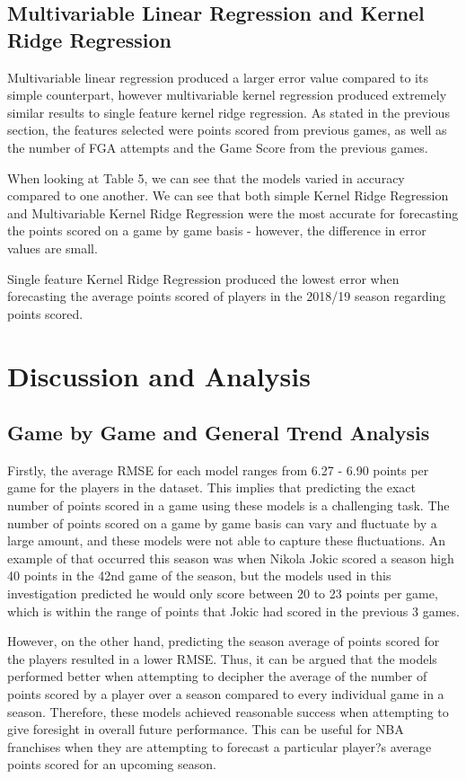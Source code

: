 \documentclass[a4paper,11pt,twoside]{article}
\begin{document}
\subsection{Multivariable Linear Regression and Kernel Ridge Regression}
Multivariable  linear regression produced a larger error value compared to its simple counterpart, however multivariable kernel regression produced extremely similar results to single feature kernel ridge regression. As stated in the previous section, the features selected were points scored from previous games, as well as the number of FGA attempts and the Game Score from the previous games.

When looking at Table 5, we can see that the models varied in accuracy compared to one another. We can see that both simple Kernel Ridge Regression and Multivariable Kernel Ridge Regression were the most accurate for forecasting the points scored on a game by game basis - however, the difference in error values are small.

Single feature Kernel Ridge Regression produced the lowest error when forecasting the average points scored of players in the 2018/19 season regarding points scored.

\newpage
\section{Discussion and Analysis}

\subsection{Game by Game and General Trend Analysis}
Firstly, the average RMSE for each model ranges from 6.27 - 6.90 points per game for the players in the dataset. This implies that predicting the exact number of points scored in a game using these models is a challenging task. The number of points scored on a game by game basis can vary and fluctuate by a large amount, and these models were not able to capture these fluctuations. An example of that occurred this season was when Nikola Jokic scored a season high 40 points in the 42nd game of the season, but the models used in this investigation predicted he would only score between 20 to 23 points per game, which is within the range of points that Jokic had scored in the previous 3 games. 

However, on the other hand, predicting the season average of points scored for the players resulted in a lower RMSE. Thus, it can be argued that the models performed better when attempting to decipher the average of the number of points scored by a player over a season compared to every individual game in a season. Therefore, these models achieved reasonable success when attempting to give foresight in overall future performance. This can be useful for NBA franchises when they are attempting to forecast a particular player?s average points scored for an upcoming season.
\end{document}
